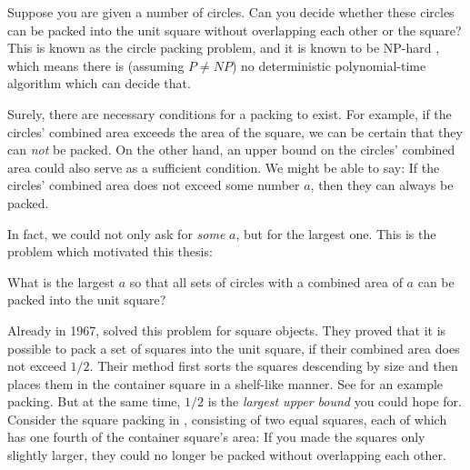 \documentclass[a4paper,style=print,oneside,bibliography=totoc,nexus,lnum,extramargin]{tubsbook}
\begin{document}
Suppose you are given a number of circles. Can you decide whether these circles can be packed into the unit square without overlapping each other or the square? This is known as the circle packing problem, and it is known to be NP-hard \cite{DFL2010circle}, which means there is (assuming $P \ne NP$) no deterministic polynomial-time algorithm which can decide that.


Surely, there are necessary conditions for a packing to exist. For example, if the circles' combined area exceeds the area of the square, we can be certain that they can \emph{not} be packed.
On the other hand, an upper bound on the circles' combined area could also serve as a sufficient condition. We might be able to say: If the circles' combined area does not exceed some number $a$, then they can always be packed.

In fact, we could not only ask for \emph{some} $a$, but for the largest one. This is the problem which motivated this thesis:

\begin{problem}\label{prb:1}
    What is the largest $a$ so that all sets of circles with a combined area of $a$ can be packed into the unit square?
\end{problem}

Already in 1967, \textcite{MM1967some} solved this problem for square objects. They proved that it is possible to pack a set of squares into the unit square, if their combined area does not exceed $1/2$. Their method first sorts the squares descending by size and then places them in the container square in a shelf-like manner. See  for an example packing. But at the same time, $1/2$ is the \emph{largest upper bound} you could hope for. Consider the square packing in , consisting of two equal squares, each of which has one fourth of the container square's area: If you made the squares only slightly larger, they could no longer be packed without overlapping each other.

\end{document}
